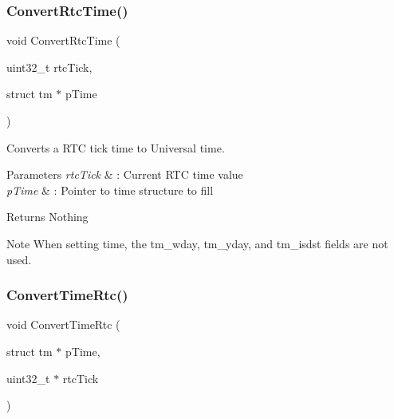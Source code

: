 \subsubsection{\texorpdfstring{Convert\+Rtc\+Time()}{ConvertRtcTime()}}
{\footnotesize\ttfamily void Convert\+Rtc\+Time (\begin{DoxyParamCaption}\item[{uint32\+\_\+t}]{rtc\+Tick,  }\item[{struct tm $\ast$}]{p\+Time }\end{DoxyParamCaption})}



Converts a R\+TC tick time to Universal time. 


\begin{DoxyParams}{Parameters}
{\em rtc\+Tick} & \+: Current R\+TC time value \\
\hline
{\em p\+Time} & \+: Pointer to time structure to fill \\
\hline
\end{DoxyParams}
\begin{DoxyReturn}{Returns}
Nothing 
\end{DoxyReturn}
\begin{DoxyNote}{Note}
When setting time, the \textquotesingle{}tm\+\_\+wday\textquotesingle{}, \textquotesingle{}tm\+\_\+yday\textquotesingle{}, and \textquotesingle{}tm\+\_\+isdst\textquotesingle{} fields are not used. 
\end{DoxyNote}
\mbox{\label{group___r_t_c___u_t_ga4923243ffbb19299329003af866ca4bb}} 
\subsubsection{\texorpdfstring{Convert\+Time\+Rtc()}{ConvertTimeRtc()}}
{\footnotesize\ttfamily void Convert\+Time\+Rtc (\begin{DoxyParamCaption}\item[{struct tm $\ast$}]{p\+Time,  }\item[{uint32\+\_\+t $\ast$}]{rtc\+Tick }\end{DoxyParamCaption})}



